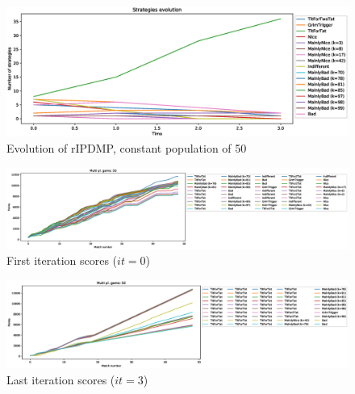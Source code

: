 \documentclass[journal,a4paper,10pt,twoside]{IEEEtran} %
\begin{document}
\begin{figure}[!ht]
    \centering
    \includegraphics[width=1\columnwidth]{../img/ripdmp-const/ripdmp-evolution-const-pop-50}
    \caption{Evolution of rIPDMP, constant population of 50}
    \label{fig:constR}
\end{figure}

\begin{figure}[!ht]
    \centering
    \includegraphics[width=1\columnwidth]{../img/ripdmp-const/ripdmp-scores-const-pop-50-r0}
    \caption{First iteration scores ($it=0$)}
    \label{fig:constFI}
\end{figure}

\begin{figure}[!ht]
    \centering
    \includegraphics[width=1\columnwidth]{../img/ripdmp-const/ripdmp-scores-const-pop-50-r3}
    \caption{Last iteration scores ($it=3$)}
    \label{fig:constLI}
\end{figure}
\end{document}
